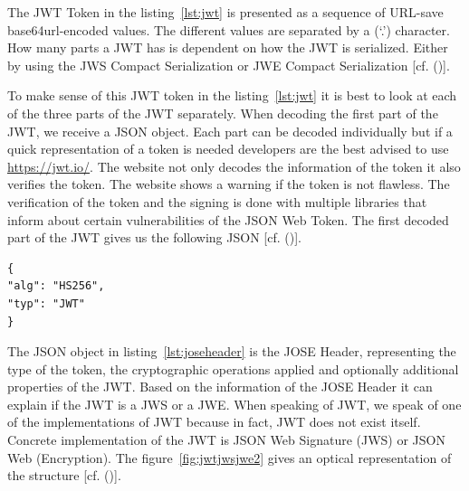 The JWT Token in the listing~\ref{lst:jwt} is presented as a sequence of URL-save base64url-encoded values. The different values are separated by a (‘.’) character. How many parts a JWT has is dependent on how the JWT is serialized. Either by using the JWS Compact Serialization or JWE Compact Serialization [cf. (\cite{JWT:IETF:Jones:2015})].


To make sense of this JWT token in the listing~\ref{lst:jwt} it is best to look at each of the three parts of the JWT separately. When decoding the first part of the JWT, we receive a JSON object. Each part can be decoded individually but if a quick representation of a token is needed developers are the best advised to use \href{https://jwt.io/} {https://jwt.io/}. The website not only decodes the information of the token it also verifies the token. The website shows a warning if the token is not flawless. The verification of the token and the signing is done with multiple libraries that inform about certain vulnerabilities of the JSON Web Token. The first decoded part of the JWT gives us the following JSON [cf. (\cite{JWT:IETF:Jones:2015})].


\begin{lstlisting}
{
"alg": "HS256",
"typ": "JWT"
}
\end{lstlisting}


The JSON object in listing~\ref{lst:joseheader} is the JOSE Header, representing the type of the token, the cryptographic operations applied and optionally additional properties of the JWT. Based on the information of the JOSE Header it can explain if the JWT is a JWS or a JWE. When speaking of JWT, we speak of one of the implementations of JWT because in fact, JWT does not exist itself. Concrete implementation of the JWT is JSON Web Signature (JWS) or JSON Web (Encryption). The figure~\ref{fig:jwtjwsjwe2} gives an optical representation of the structure [cf. (\cite{Siriwardena:JWTJWSJWE:2016})].


